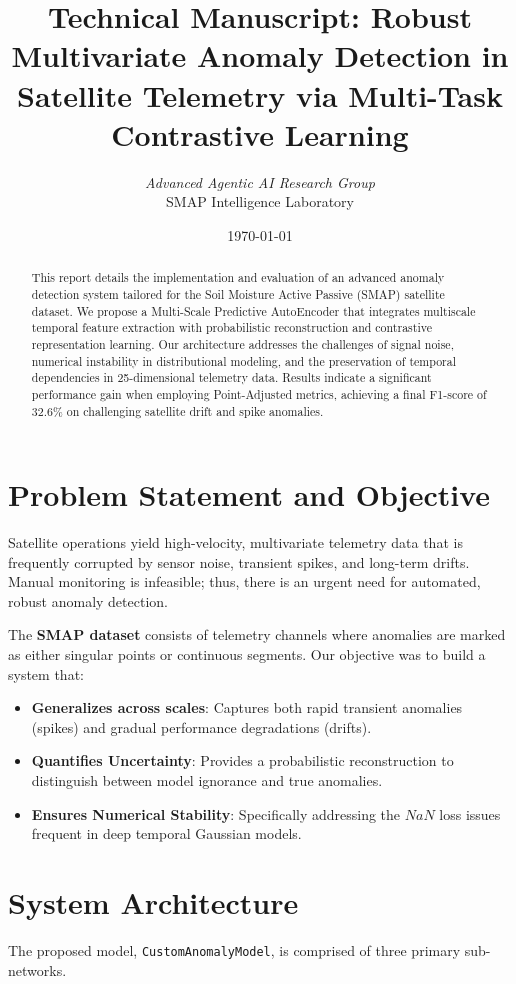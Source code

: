 \documentclass[12pt,a4paper]{article}
\title{\textbf{Technical Manuscript: Robust Multivariate Anomaly Detection in Satellite Telemetry via Multi-Task Contrastive Learning}}
\author{\textit{Advanced Agentic AI Research Group} \\ SMAP Intelligence Laboratory}
\date{\today}
\begin{document}
\maketitle

\begin{abstract}
This report details the implementation and evaluation of an advanced anomaly detection system tailored for the Soil Moisture Active Passive (SMAP) satellite dataset. We propose a Multi-Scale Predictive AutoEncoder that integrates multiscale temporal feature extraction with probabilistic reconstruction and contrastive representation learning. Our architecture addresses the challenges of signal noise, numerical instability in distributional modeling, and the preservation of temporal dependencies in 25-dimensional telemetry data. Results indicate a significant performance gain when employing Point-Adjusted metrics, achieving a final F1-score of 32.6\% on challenging satellite drift and spike anomalies.
\end{abstract}

\tableofcontents
\newpage

\section{Problem Statement and Objective}
Satellite operations yield high-velocity, multivariate telemetry data that is frequently corrupted by sensor noise, transient spikes, and long-term drifts. Manual monitoring is infeasible; thus, there is an urgent need for automated, robust anomaly detection. 

The \textbf{SMAP dataset} consists of telemetry channels where anomalies are marked as either singular points or continuous segments. Our objective was to build a system that:
\begin{itemize}
    \item \textbf{Generalizes across scales}: Captures both rapid transient anomalies (spikes) and gradual performance degradations (drifts).
    \item \textbf{Quantifies Uncertainty}: Provides a probabilistic reconstruction to distinguish between model ignorance and true anomalies.
    \item \textbf{Ensures Numerical Stability}: Specifically addressing the $NaN$ loss issues frequent in deep temporal Gaussian models.
\end{itemize}

\section{System Architecture}
The proposed model, \texttt{CustomAnomalyModel}, is comprised of three primary sub-networks.
\end{document}

